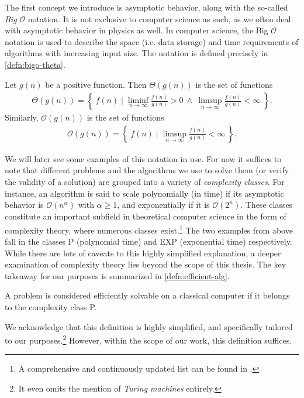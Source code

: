The first concept we introduce is asymptotic behavior, along with the so-called
\emph{Big }$\mathcal{O}$ notation. It is not exclusive to computer science as such, as we
often deal with asymptotic behavior in physics as well.  In computer science,
the Big $\mathcal{O}$ notation is used to describe the space (i.e. data storage) and
time requirements of algorithms with increasing input size. The notation is
defined precisely in \cref{defn:bigo-theta}.
\begin{defn}\label{defn:bigo-theta}
  Let $g(n)$ be a positive function. Then $\Theta(g(n))$ is the set of
  functions 
  \begin{align*}
    \Theta(g(n)) = \left\{ \ f(n) \mid \liminf_{n\to\infty} \frac{f(n)}{g(n)} > 0 \
    \wedge \ \limsup_{n\to\infty} \frac{f(n)}{g(n)} < \infty \ \right\}
  .\end{align*}
  Similarly, $\mathcal{O}(g(n))$ is the set of functions 
  \begin{align*}
    \mathcal{O}(g(n)) = \left\{ \ f(n) \mid 
    \limsup_{n\to\infty} \frac{f(n)}{g(n)} < \infty \ \right\}
  .\end{align*}
\end{defn}
We will later see some examples of this notation in use. For now it suffices to
note that different problems and the algorithms we use to solve them (or verify
the validity of a solution) are grouped into a variety of \emph{complexity
classes}. For instance, an algorithm is said to scale polynomially (in time) if
its asymptotic behavior is $\mathcal{O}(n^\alpha)$ with $\alpha \geq 1$, and
exponentially if it is $\mathcal{O}(2^n)$. These classes constitute an
important subfield in theoretical computer science in the form of
complexity theory, where numerous classes exist.\footnote{A comprehensive and continuously
updated list can be found in \cite{ComplexityZoo}.} The two examples from above
fall in the classes \textsf{P} (polynomial time) and \textsf{EXP} (exponential
time) respectively.  While there are lots of caveats to this highly simplified
explanation, a deeper examination of complexity theory lies beyond the scope of
this thesis. The key takeaway for our purposes is summarized in
\cref{defn:efficient-alg}.
\begin{defn}\label{defn:efficient-alg}
  A problem is considered efficiently solvable on a classical computer if it
  belongs to the complexity class \textsf{P}.
\end{defn}
We acknowledge that this definition is highly simplified, and specifically
tailored to our purposes.\footnote{It even omits the mention of
\emph{Turing machines} entirely.} However, within the scope of our work, this
definition suffices.

